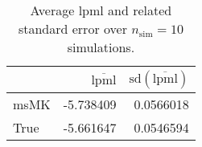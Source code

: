 \begin{table}[H]

\caption{Average lpml and related standard error over $n_{\text{sim}} = 10$ simulations.}
\centering
\begin{tabular}[t]{lrr}
\toprule
  & $\overbar{\text{lpml}}$ & $\text{sd}(\overbar{\text{lpml}})$\\
\midrule
msMK & -5.738409 & 0.0566018\\
True & -5.661647 & 0.0546594\\
\bottomrule
\end{tabular}
\end{table}